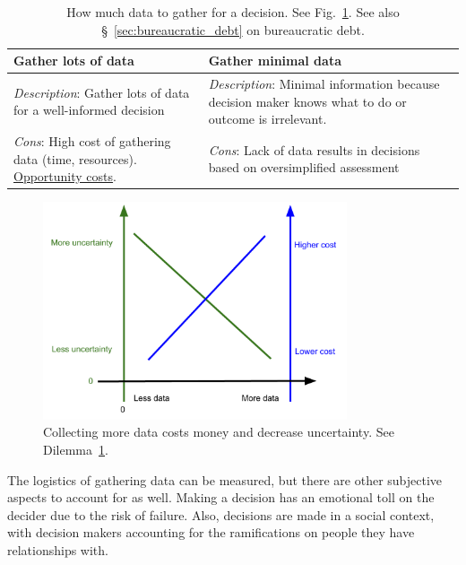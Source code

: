 \begin{center}
\begin{table}[ht]
\begin{tabular}{ | m{\dilemmatablewidth}| m{\dilemmatablewidth} | } 
  \hline
  \textbf{Gather lots of data} &
  \textbf{Gather minimal data} \\
  \hline
  \textit{Description}: Gather lots of data for a well-informed decision &
  \textit{Description}: Minimal information because decision maker knows what to do or outcome is irrelevant.  \\  
  \hline
  \textit{Cons}: High cost of gathering data (time, resources). \href{https://en.wikipedia.org/wiki/Opportunity_cost}{Opportunity costs}. & 
  \textit{Cons}: Lack of data results in decisions based on oversimplified assessment \\
  \hline
\end{tabular}
\caption{How much data to gather for a decision. See Fig.~\ref{fig:data_collection_cost_uncertainty}. See also \S~\ref{sec:bureaucratic_debt} on bureaucratic debt.
}
\label{table:gather_data_lots-vs-little}
\end{table}
\end{center}

\begin{figure}[ht]
        \centering
        \includegraphics[width=0.8\textwidth]{images/cost_and_uncertainty_for_data_collection}
        \caption{Collecting more data costs money and decrease uncertainty. See Dilemma~\ref{table:gather_data_lots-vs-little}.}
        \label{fig:data_collection_cost_uncertainty}
\end{figure}

The logistics of gathering data can be measured, but there are other subjective aspects to account for as well. Making a decision has an emotional toll on the decider due to the risk of failure. Also, decisions are made in a social context, with decision makers accounting for the ramifications on people they have relationships with. 


